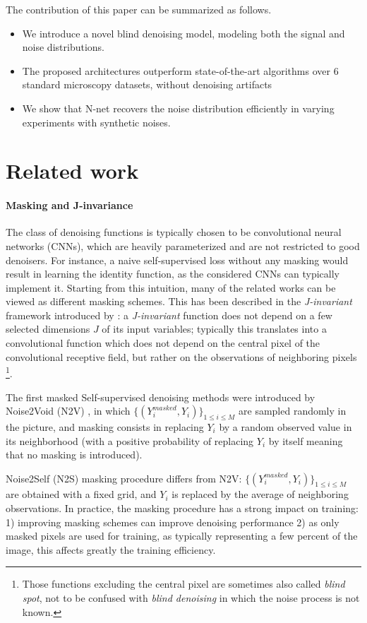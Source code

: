 \documentclass{article}
\begin{document}
The contribution of this paper can be summarized as follows.
\begin{itemize}
  \item We introduce a novel blind denoising model, modeling both the signal and noise distributions.
  \item The proposed architectures outperform state-of-the-art algorithms over 6 standard microscopy datasets, without denoising artifacts
  \item We show that N-net recovers the noise distribution efficiently in varying experiments with synthetic noises.
\end{itemize}

\section{Related work}
\label{sec:related}
\paragraph{Masking and J-invariance}
The class of denoising functions is typically chosen to be convolutional neural networks (CNNs), which are heavily parameterized and are not restricted to good denoisers. For instance, a naive self-supervised loss without any masking would result in learning the identity function, as the considered CNNs can typically implement it. Starting from this intuition, many of the related works can be viewed as different masking schemes. This has been described in the \textit{J-invariant} framework introduced by \cite{batson2019noise2self}: a \textit{J-invariant} function does not depend on a few selected dimensions $J$ of its input variables; typically this translates into a convolutional function which does not depend on the central pixel of the convolutional receptive field, but rather on the observations of neighboring pixels \footnote{Those functions excluding the central pixel are sometimes also called \textit{blind spot}, not to be confused with \textit{blind denoising} in which the noise process is not known.}.

The first masked Self-supervised denoising methods were introduced by Noise2Void (N2V) \cite{krull2018noise2void}, in which $\{(Y^{masked}_i,Y_i)\}_{1\leqslant i\leqslant M}$ are sampled  randomly in the picture, and masking consists in replacing $Y_i$ by a random observed value in its neighborhood (with a positive probability of replacing $Y_i$ by itself meaning that no masking is introduced).

Noise2Self (N2S) \cite{batson2019noise2self} masking procedure differs from N2V: $\{(Y^{masked}_i,Y_i)\}_{1\leqslant i\leqslant M}$ are obtained with a fixed grid, and $Y_i$ is replaced by the average of neighboring observations. In practice, the masking procedure has a strong impact on training: 1) improving masking schemes can improve denoising performance 2) as only masked pixels are used for training, as typically representing a few percent of the image, this affects greatly the training efficiency.
\end{document}
